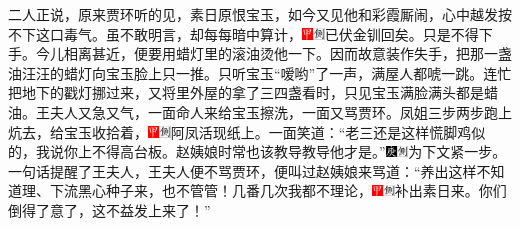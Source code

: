 二人正说，原来贾环听的见，素日原恨宝玉，如今又见他和彩霞厮闹，心中越发按不下这口毒气。虽不敢明言，却每每暗中算计，{\includegraphics[width=3mm]{../Images/00002}\includegraphics[width=3mm]{../Images/00011}\footnotesize \kaishu 已伏金钏回矣。}只是不得下手。今儿相离甚近，便要用蜡灯里的滚油烫他一下。因而故意装作失手，把那一盏油汪汪的蜡灯向宝玉脸上只一推。只听宝玉``嗳哟''了一声，满屋人都唬一跳。连忙把地下的戳灯挪过来，又将里外屋的拿了三四盏看时，只见宝玉满脸满头都是蜡油。王夫人又急又气，一面命人来给宝玉擦洗，一面又骂贾环。凤姐三步两步跑上炕去，给宝玉收拾着，{\includegraphics[width=3mm]{../Images/00002}\includegraphics[width=3mm]{../Images/00011}\footnotesize \kaishu 阿凤活现纸上。}一面笑道：``老三还是这样慌脚鸡似的，我说你上不得高台板。赵姨娘时常也该教导教导他才是。''{\includegraphics[width=3mm]{../Images/00004}\includegraphics[width=3mm]{../Images/00011}\footnotesize \kaishu 为下文紧一步。}一句话提醒了王夫人，王夫人便不骂贾环，便叫过赵姨娘来骂道：``养出这样不知道理、下流黑心种子来，也不管管！几番几次我都不理论，{\includegraphics[width=3mm]{../Images/00002}\includegraphics[width=3mm]{../Images/00011}\footnotesize \kaishu 补出素日来。}你们倒得了意了，这不益发上来了！''

